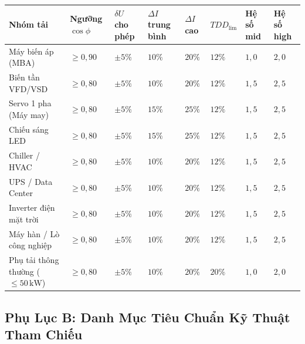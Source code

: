 \documentclass[12pt,a4paper]{article}
\begin{document}
\begin{center}
\small
\setlength{\tabcolsep}{3.5pt}
\begin{tabular}{>{\raggedright\arraybackslash}p{3.6cm}
                >{\centering\arraybackslash}p{1.6cm}
                >{\centering\arraybackslash}p{1.5cm}
                >{\centering\arraybackslash}p{1.5cm}
                >{\centering\arraybackslash}p{1.5cm}
                >{\centering\arraybackslash}p{1.5cm}
                >{\centering\arraybackslash}p{1.5cm}
                >{\centering\arraybackslash}p{1.5cm}}
\toprule
\rowcolor{primary}
\color{white}\textbf{Nhóm tải} &
\color{white}\textbf{Ngưỡng $\cos\phi$} &
\color{white}\textbf{$\delta U$ cho phép} &
\color{white}\textbf{$\Delta I$ trung bình} &
\color{white}\textbf{$\Delta I$ cao} &
\color{white}\textbf{$TDD_{\mathrm{lim}}$} &
\color{white}\textbf{Hệ số mid} &
\color{white}\textbf{Hệ số high} \\
\midrule
Máy biến áp (MBA) & $\ge 0{,}90$ & $\pm5\%$ & $10\%$ & $20\%$ & $12\%$ & $1{,}0$ & $2{,}0$ \\
\rowcolor{lightgray}
Biến tần VFD/VSD & $\ge 0{,}80$ & $\pm5\%$ & $10\%$ & $20\%$ & $12\%$ & $1{,}5$ & $2{,}5$ \\
Servo 1 pha (Máy may) & $\ge 0{,}80$ & $\pm5\%$ & $15\%$ & $25\%$ & $12\%$ & $1{,}5$ & $2{,}5$ \\
\rowcolor{lightgray}
Chiếu sáng LED & $\ge 0{,}80$ & $\pm5\%$ & $15\%$ & $25\%$ & $12\%$ & $1{,}5$ & $2{,}5$ \\
Chiller / HVAC & $\ge 0{,}80$ & $\pm5\%$ & $10\%$ & $20\%$ & $12\%$ & $1{,}5$ & $2{,}5$ \\
\rowcolor{lightgray}
UPS / Data Center & $\ge 0{,}80$ & $\pm5\%$ & $10\%$ & $20\%$ & $12\%$ & $1{,}5$ & $2{,}5$ \\
Inverter điện mặt trời & $\ge 0{,}80$ & $\pm5\%$ & $10\%$ & $20\%$ & $12\%$ & $1{,}5$ & $2{,}5$ \\
\rowcolor{lightgray}
Máy hàn / Lò công nghiệp & $\ge 0{,}80$ & $\pm5\%$ & $10\%$ & $20\%$ & $12\%$ & $1{,}5$ & $2{,}5$ \\
Phụ tải thông thường ($\le50\,\mathrm{kW}$) & $\ge 0{,}80$ & $\pm5\%$ & $10\%$ & $20\%$ & $20\%$ & $1{,}0$ & $2{,}0$ \\
\bottomrule
\end{tabular}
\end{center}

\subsection{Phụ Lục B: Danh Mục Tiêu Chuẩn Kỹ Thuật Tham Chiếu}
\end{document}
